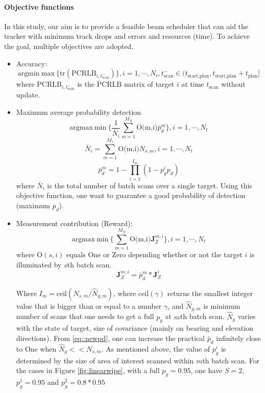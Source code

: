 \documentclass[12pt,journal,draftclsnofoot,onecolumn]{IEEEtran}
\begin{document}
\paragraph{Objective functions}
In this study, our aim is to provide a feasible beam scheduler that can aid the tracker with minimum track drops and errors and resources (time). To achieve the goal, multiple objectives are adopted.
\begin{itemize}
	\item Accuracy:
	\begin{equation}
		\text{argmin}~\text{max}~ \{\text{tr}(\text{PCRLB}_{i,t^{-}_{\text{scan}}})\}, i=1,\cdots,N_t, t^{-}_{\text{scan}}\in(t_{\text{start,plan}}, t_{\text{start,plan}}+t_{\text{plan}}]
		\label{eq::pcrlb_obj}
	\end{equation}
	where $\text{PCRLB}_{i,t^{-}_{\text{scan}}}$ is the $\text{PCRLB}$ matrix of target $i$ at time  $t_\text{scan}$ without update.
	\item Maximum average probability detection
	\begin{equation}
		\text{argmax}~\text{min}~ \{\frac{1}{\bar{N} _i}\sum_{m=1}^{M_S} \text{O(m,i)}\bar{p}^{m}_{d}\}, i=1,\cdots,N_t
		\label{eq::pd_obj}
	\end{equation}
	\begin{equation}
		\bar{N} _i =  \sum_{m=1}^{M_s}\text{O(m,i)}{N_{s,m}}, i=1,\cdots,N_t 
		\label{eq::numofscans_obj}
	\end{equation}
	\begin{equation}
		\bar p^m_d=1-\prod_{i=1}^{I_{m}}(1-p_g^{i} p_d)
		\label{eq::newpd}
	\end{equation}
	where $\bar{N}_i$ is the total number of batch scans over a single target. Using this objective function, one want to guarantee a good probability of detection (maximum $p_d$).
	\item Measurement contribution (Reward):
	\begin{equation}
		\text{argmax}~\text{min}~ \{\sum_{m=1}^{M_S} \text{O(m,i)}\mathbf{J}_Z^{m,i}\}, i=1,\cdots,N_t
		\label{eq::Jz_obj}
	\end{equation}
	where $\text{O}(s,i)$ equals One or Zero depending whether or not the target $i$ is illuminated by $s$th batch scan.
	\begin{equation}
		\mathbf{J}_Z^{m,i} = \bar{p}^m_d*\mathbf{J}_Z^i
	\end{equation}
	
	Where $I_{m} = \text{ceil}(N_{s,m}/{\hat N_{g,m}})$, where $\text{ceil}(\gamma)$ returns the smallest integer value that is bigger than or equal to a number $\gamma$, and $\hat{N}_{g,m}$ is minimum number of scans that one needs to get a full $p_g$ at $m$th batch scan. $\hat{N}_g$ varies with the state of target, size of covariance (mainly on bearing and elevation directions). From \eqref{eq::newpd}, one can increase the practical $\bar{p}_d$ infinitely close to One when $\hat{N}_g<<N_{s,m}$.
	As mentioned above, the value of $p_g^{i}$ is determined by the size of area of interest scanned within $m$th batch scan. For the cases in Figure \ref{fig:linearwipe}, with a full $p_g=0.95$, one have $S = 2$, $p_g^1 = 0.95$ and $p_g^2 = 0.8*0.95$
	
\end{itemize}
\end{document}
